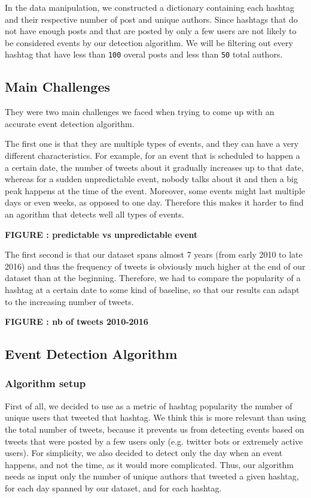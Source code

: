 \documentclass[11pt]{article}
\begin{document}
In the data manipulation, we constructed a dictionary containing each hashtag and their respective number of post and unique authors.
Since hashtags that do not have enough posts and that are posted by only a few users are not likely to be considered events by our detection algorithm. We will be filtering out every hashtag that have less than \texttt{100} overal posts and less than \texttt{50} total authors. 

\subsection{Main Challenges}
They were two main challenges we faced when trying to come up with an accurate event detection algorithm. 

The first one is that they are multiple types of events, and they can have a very different characteristics. For example, for an event that is scheduled to happen a a certain date, the number of tweets about it gradually increases up to that date, whereas for a sudden unpredictable event, nobody talks about it and then a big peak happens at the time of the event. Moreover, some events might last multiple days or even weeks, as opposed to one day. Therefore this makes it harder to find an agorithm that detects well all types of events.

\textbf{FIGURE : predictable vs unpredictable event}

The first second is that our dataset spans almost 7 years (from early 2010 to late 2016) and thus the frequency of tweets is obviously much higher at the end of our dataset than at the beginning. Therefore, we had to compare the popularity of a hashtag at a certain date to some kind of baseline, so that our results can adapt to the increasing number of tweets.

\textbf{FIGURE : nb of tweets 2010-2016}

\subsection{Event Detection Algorithm}
\subsubsection{Algorithm setup}
First of all, we decided to use as a metric of hashtag popularity the number of unique users that tweeted that hashtag. We think this is more relevant than using the total number of tweets, because it prevents us from detecting events based on tweets that were posted by a few users only (e.g. twitter bots or extremely active users). For simplicity, we also decided to detect only the day when an event happens, and not the time, as it would more complicated. Thus, our algorithm needs as input only the number of unique authors that tweeted a given hashtag, for each day spanned by our dataset, and for each hashtag.
\end{document}
